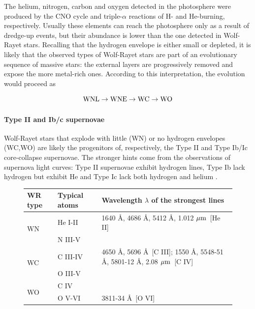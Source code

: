 \documentclass[a4paper,titlepage]{book}     	%
\begin{document}
The helium, nitrogen, carbon and oxygen detected in the photosphere were produced by the CNO cycle and triple-$\alpha$ reactions of H- and He-burning, respectively. Usually these elements can reach the photosphere only as a result of dredge-up events, but their abundance is lower than the one detected in Wolf-Rayet stars. Recalling that the hydrogen envelope is either small or depleted, it is likely that the observed types of Wolf-Rayet stars are part of an evolutionary sequence of massive stars: the external layers are progressively removed and expose the more metal-rich ones. According to this interpretation, the evolution would proceed as

\[\rm WNL \rightarrow WNE \rightarrow WC \rightarrow WO\]

\paragraph{Type II and Ib/c supernovae} Wolf-Rayet stars that explode with little (WN) or no hydrogen envelopes (WC,WO) are likely the progenitors of, respectively, the Type II and Type Ib/Ic core-collapse supernovae. The stronger hints come from the observations of supernova light curves: Type II supernovae exhibit hydrogen lines, Type Ib lack hydrogen but exhibit He and Type Ic lack both hydrogen and helium \cite{WR_signature,parsec2015_chen,Limongi2010_preSNevo}.

\renewcommand{\arraystretch}{1.5}
\begin{figure}[h]
	\centering
		\begin{tabular}{lll}
			\toprule
			WR type & Typical atoms & Wavelength $\lambda$ of the strongest lines \\
			\midrule
			\multirow{2}{*}{WN}  & He I-II  & 1640 \AA , 4686 \AA, 5412 \AA, 1.012 $\mu\rm m$~[He II] \\
			& N III-V & \\ 
			\hline
			\multirow{2}{*}{WC}  & C III-IV  & 4650 \AA, 5696 \AA ~[C III]; 1550 \AA,  5548-51 \AA, 5801-12 \AA, 2.08 $\mu\rm m$~[C IV] \\
			& O III-V & \\
			\hline
			\multirow{2}{*}{WO}  & C IV  &\\
			& O V-VI & 3811-34 \AA~[O VI]\\
			\bottomrule 	
		\end{tabular}
		 \label{tab:WRclassification}
\end{figure}
\end{document}
